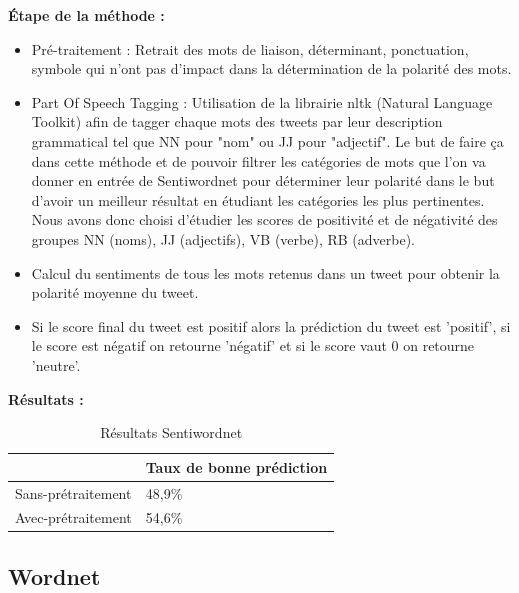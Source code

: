 \par \textbf{Étape de la méthode :} \\
\begin{itemize}
	\item Pré-traitement : Retrait des mots de liaison, déterminant, ponctuation, symbole qui n'ont pas d'impact dans la détermination de la polarité des mots.	 \\
	\item Part Of Speech Tagging : Utilisation de la librairie nltk (Natural Language Toolkit) afin de tagger chaque mots des tweets par leur description grammatical tel que NN pour "nom" ou JJ pour "adjectif". Le but de faire ça dans cette méthode et de pouvoir filtrer les catégories de mots que l'on va donner en entrée de Sentiwordnet pour déterminer leur polarité dans le but d'avoir un meilleur résultat en étudiant les catégories les plus pertinentes. Nous avons donc choisi d'étudier les scores de positivité et de négativité des groupes NN (noms), JJ (adjectifs), VB (verbe), RB (adverbe). \\
	\item Calcul du sentiments de tous les mots retenus dans un tweet pour obtenir la polarité moyenne du tweet. \\
	\item Si le score final du tweet est positif alors la prédiction du tweet est 'positif', si le score est négatif on retourne 'négatif' et si le score vaut 0 on retourne 'neutre'. \\
\end{itemize}

\par \textbf{Résultats :} \\

\begin{table}[h!]
\centering
\caption{Résultats Sentiwordnet}
\label{my-label}
\begin{tabular}{|l|l|}
\hline
                   & Taux de bonne prédiction \\ \hline
Sans-prétraitement & 48,9\%                   \\ \hline
Avec-prétraitement & 54,6\%                   \\ \hline
\end{tabular}
\end{table}



\subsection{Wordnet}

